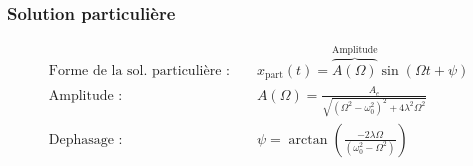 \subsubsection*{Solution particulière}

\begin{align*}
    \text{Forme de la sol. particulière : } && x_\text{part}(t)  = 
    \overbrace{A(\Omega)}
    ^\text{Amplitude}
    \sin \left( \Omega t + \psi  \right) \\
    \text{Amplitude :} &&
    A(\Omega) = \frac{A_e}{\sqrt{(\Omega^2-\omega_0^2)^2 + 4 \lambda^2 \Omega^2}} \\
    \text{Dephasage : } &&
    \psi = \arctan \left( \frac{- 2 \lambda \Omega}{(\omega_0^2 - \Omega^2)} \right)
\end{align*}


